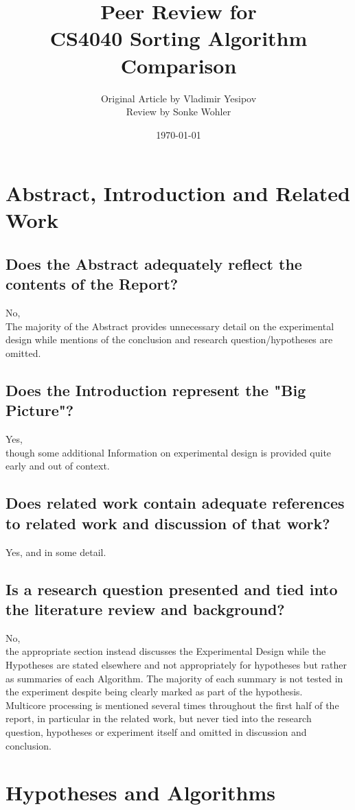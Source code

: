 \documentclass{article}
\title{{\large Peer Review for }
	\\{\LARGE CS4040 Sorting Algorithm Comparison}}
\author{Original Article by Vladimir Yesipov
	\\ {\small Review by Sonke Wohler}}
\date{\today}
\begin{document}
  \maketitle
    \section{Abstract, Introduction and Related Work}	
      \subsection{ Does the Abstract adequately reflect the contents of the Report?}
        No,
        \\
        The majority of the Abstract provides unnecessary detail on the experimental design while mentions of the conclusion and research question/hypotheses are omitted.
      \subsection{ Does the Introduction represent the "Big Picture"?}
        Yes,
        \\
        though some additional Information on experimental design is provided quite early and out of context.
      \subsection{ Does related work contain adequate references to related work and discussion of that work?}
        Yes, and in some detail. 
      \subsection{ Is a research question presented and tied into the literature review and background?}
        No,
        \\
        the appropriate section instead discusses the Experimental Design while the Hypotheses are stated elsewhere and not appropriately for hypotheses but rather as summaries of each Algorithm. The majority of each summary is not tested in the experiment despite being clearly marked as part of the hypothesis.
        \\
        Multicore processing is mentioned several times throughout the first half of the report, in particular in the related work, but never tied into the research question, hypotheses or experiment itself and omitted in discussion and conclusion.
        
    \section{Hypotheses and Algorithms}
\end{document}

